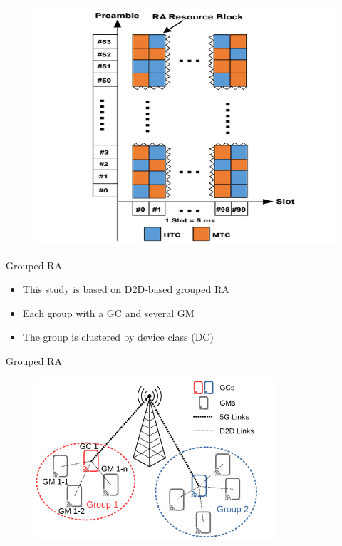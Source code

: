 \documentclass{beamer}
\begin{document}
\begin{frame}   
    \begin{figure}[t]
    \centering
    \includegraphics[width=1\textwidth]{figures/1.png}
    \end{figure}
\end{frame}
\begin{frame} {Grouped RA}
    \begin{itemize}
        \item {This study is based on D2D-based grouped RA}
        \item {Each group with a GC and several GM}
        \item {The group is clustered by device class (DC)}
    \end{itemize}
\end{frame}
\begin{frame} {Grouped RA}
    \begin{figure}[t]
    \centering
    \includegraphics[width=0.8\textwidth]{figures/2.png}
    \end{figure}
\end{frame}
\end{document}
